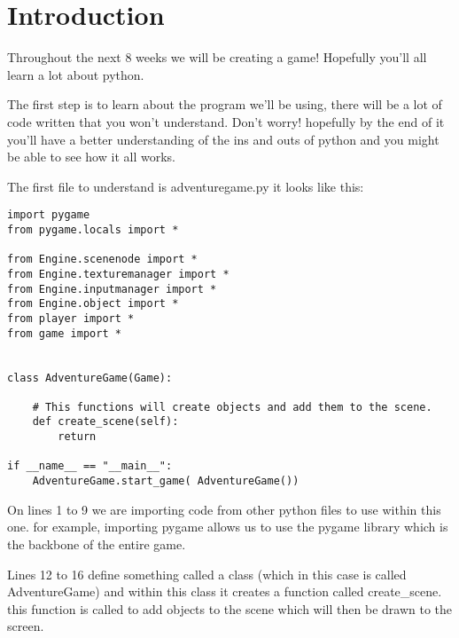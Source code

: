 \documentclass[11pt]{report}
\begin{document}
\chapter{Introduction}
Throughout the next 8 weeks we will be creating a game! Hopefully you'll all learn a lot about python.

The first step is to learn about the program we'll be using, there will be a lot of code written that you won't understand. Don't worry! hopefully by the end of it you'll have a better understanding of the ins and outs of python and you might be able to see how it all works.

The first file to understand is adventuregame.py 
it looks like this:
\begin{lstlisting}
import pygame
from pygame.locals import *

from Engine.scenenode import *
from Engine.texturemanager import *
from Engine.inputmanager import *
from Engine.object import *
from player import *
from game import *


class AdventureGame(Game):

    # This functions will create objects and add them to the scene.
    def create_scene(self):
        return

if __name__ == "__main__":
    AdventureGame.start_game( AdventureGame())
\end{lstlisting}
On lines 1 to 9 we are importing code from other python files to use within this one. for example, importing pygame allows us to use the pygame library which is the backbone of the entire game.

Lines 12 to 16 define something called a class (which in this case is called AdventureGame) and within this class it creates a function called create_scene. this function is called to add objects to the scene which will then be drawn to the screen.
\end{document}
